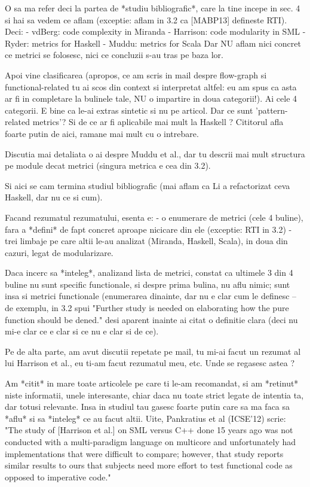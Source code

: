 \documentclass{article}
\begin{document}
O sa ma refer deci la partea de *studiu bibliografic*, care la tine
incepe in sec. 4 si hai sa vedem ce aflam (exceptie: aflam in 3.2 ca
[MABP13] defineste RTI). Deci:
- vdBerg: code complexity in Miranda
- Harrison: code modularity in SML
- Ryder: metrics for Haskell
- Muddu: metrics for Scala
Dar NU aflam nici concret ce metrici se folosesc, nici ce concluzii
s-au tras pe baza lor.

Apoi vine clasificarea (apropos, ce am scris in mail despre flow-graph
si functional-related tu ai scos din context si interpretat altfel:
eu am spus ca asta ar fi in completare la bulinele tale, NU o impartire
in doua categorii!).
Ai cele 4 categorii. E bine ca le-ai extras sintetic si nu pe articol.
Dar ce sunt 'pattern-related metrics'? Si de ce ar fi aplicabile
mai mult la Haskell ? Cititorul afla foarte putin de aici, ramane mai
mult cu o intrebare.

Discutia mai detaliata o ai despre Muddu et al., dar tu descrii mai
mult structura pe module decat metrici (singura metrica e cea din 3.2).

Si aici se cam termina studiul bibliografic (mai aflam ca Li a
refactorizat ceva Haskell, dar nu ce si cum).

Facand rezumatul rezumatului, esenta e:
- o enumerare de metrici (cele 4 buline), fara a *defini* de fapt
concret aproape nicicare din ele (exceptie: RTI in 3.2)
- trei limbaje pe care altii le-au analizat (Miranda, Haskell, Scala),
in doua din cazuri, legat de modularizare.

Daca incerc sa *inteleg*, analizand lista de metrici, constat ca
ultimele 3 din 4 buline nu sunt specific functionale, si despre prima
bulina, nu aflu nimic; sunt insa si metrici functionale (enumerarea
dinainte, dar nu e clar cum le definesc -- de exemplu, in 3.2 spui
"Further study is needed on elaborating how the pure function should be
dened." desi aparent inainte ai citat o definitie clara (deci nu mi-e
clar ce e clar si ce nu e clar si de ce).

Pe de alta parte, am avut discutii repetate pe mail, tu mi-ai facut
un rezumat al lui Harrison et al., eu ti-am facut rezumatul meu, etc.
Unde se regasesc astea ?

Am *citit* in mare toate articolele pe care ti le-am recomandat, si
am *retinut* niste informatii, unele interesante, chiar daca nu toate
strict legate de intentia ta, dar totusi relevante. Insa in studiul
tau gasesc foarte putin care sa ma faca sa *aflu* si sa *inteleg*
ce au facut altii. Uite, Pankratius et al (ICSE'12) scrie:
"The study of [Harrison et al.] on SML versus C++ done 15 years ago
was not conducted with a multi-paradigm language on multicore and
unfortunately had implementations that were difficult to compare;
however, that study reports similar results to ours that subjects
need more effort to test functional code as opposed to imperative code."
\end{document}
